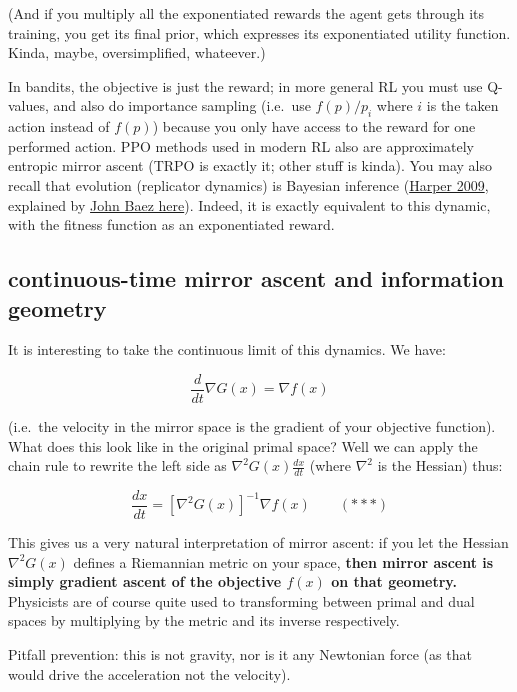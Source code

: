 (And if you multiply all the exponentiated rewards the agent gets through its training, you get its final prior, which expresses its exponentiated utility function. Kinda, maybe, oversimplified, whateever.)

In bandits, the objective is just the reward; in more general RL you must use Q-values, and also do importance sampling (i.e.~use \(f(p)/p_i\) where \(i\) is the taken action instead of \(f(p)\)) because you only have access to the reward for one performed action. PPO methods used in modern RL also are approximately entropic mirror ascent (TRPO is exactly it; other stuff is kinda). You may also recall that evolution (replicator dynamics) is Bayesian inference (\href{https://arxiv.org/abs/0911.1763}{Harper 2009}, explained by \href{https://johncarlosbaez.wordpress.com/2012/06/01/information-geometry-part-9/}{John Baez here}). Indeed, it is exactly equivalent to this dynamic, with the fitness function as an exponentiated reward.

\hypertarget{continuous-time-mirror-ascent-and-information-geometry}{%
\subsection{continuous-time mirror ascent and information geometry}\label{continuous-time-mirror-ascent-and-information-geometry}}

It is interesting to take the continuous limit of this dynamics. We have:

\[\frac{d}{dt}\nabla G(x)= \nabla f(x)\]

(i.e.~the velocity in the mirror space is the gradient of your objective function). What does this look like in the original primal space? Well we can apply the chain rule to rewrite the left side as \(\nabla^2 G(x)\frac{dx}{dt}\) (where \(\nabla^2\) is the Hessian) thus:

\[\frac{dx}{dt}=[\nabla^2 G(x)]^{-1}\nabla f(x)\quad\quad (***)\]

This gives us a very natural interpretation of mirror ascent: if you let the Hessian \(\nabla^2 G(x)\) defines a Riemannian metric on your space, \textbf{then mirror ascent is simply gradient ascent of the objective \(f(x)\) on that geometry.} Physicists are of course quite used to transforming between primal and dual spaces by multiplying by the metric and its inverse respectively.

Pitfall prevention: this is not gravity, nor is it any Newtonian force (as that would drive the acceleration not the velocity).

